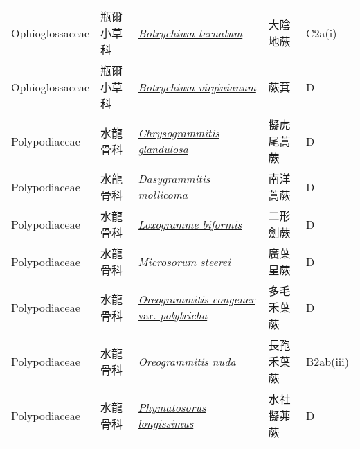 {\begin{longtable}{p{2.5cm}p{2.5cm}p{4.5cm}p{2.5cm}p{3cm}}
    Ophioglossaceae & 瓶爾小草科 & \href{http://www.theplantlist.org/tpl1.1/search?q=Botrychium+ternatum}{\textit{Botrychium ternatum} } & 大陰地蕨 & C2a(i) \index{Botrychium@\textit{Botrychium}!ternatum@\textit{ternatum}}  \index{大陰地蕨} \\
    Ophioglossaceae & 瓶爾小草科 & \href{http://www.theplantlist.org/tpl1.1/search?q=Botrychium+virginianum}{\textit{Botrychium virginianum} } & 蕨萁 & D \index{Botrychium@\textit{Botrychium}!virginianum@\textit{virginianum}}  \index{蕨萁} \\
    Polypodiaceae & 水龍骨科 & \href{http://www.theplantlist.org/tpl1.1/search?q=Chrysogrammitis+glandulosa}{\textit{Chrysogrammitis glandulosa} } & 擬虎尾蒿蕨 & D \index{Chrysogrammitis@\textit{Chrysogrammitis}!glandulosa@\textit{glandulosa}}  \index{擬虎尾蒿蕨} \\
    Polypodiaceae & 水龍骨科 & \href{http://www.theplantlist.org/tpl1.1/search?q=Dasygrammitis+mollicoma}{\textit{Dasygrammitis mollicoma} } & 南洋蒿蕨 & D \index{Dasygrammitis@\textit{Dasygrammitis}!mollicoma@\textit{mollicoma}}  \index{南洋蒿蕨} \\
    Polypodiaceae & 水龍骨科 & \href{http://www.theplantlist.org/tpl1.1/search?q=Loxogramme+biformis}{\textit{Loxogramme biformis} } & 二形劍蕨 & D \index{Loxogramme@\textit{Loxogramme}!biformis@\textit{biformis}}  \index{二形劍蕨} \\
    Polypodiaceae & 水龍骨科 & \href{http://www.theplantlist.org/tpl1.1/search?q=Microsorum+steerei}{\textit{Microsorum steerei} } & 廣葉星蕨 & D \index{Microsorum@\textit{Microsorum}!steerei@\textit{steerei}}  \index{廣葉星蕨} \\
    Polypodiaceae & 水龍骨科 & \href{http://www.theplantlist.org/tpl1.1/search?q=Oreogrammitis+congener+var.+polytricha}{\textit{Oreogrammitis congener} var. \textit{polytricha} } & 多毛禾葉蕨 & D \index{Oreogrammitis@\textit{Oreogrammitis}!congener@\textit{congener}!var. polytricha@var. \textit{polytricha}}  \index{多毛禾葉蕨} \\
    Polypodiaceae & 水龍骨科 & \href{http://www.theplantlist.org/tpl1.1/search?q=Oreogrammitis+nuda}{\textit{Oreogrammitis nuda} } & 長孢禾葉蕨 & B2ab(iii) \index{Oreogrammitis@\textit{Oreogrammitis}!nuda@\textit{nuda}}  \index{長孢禾葉蕨} \\
    Polypodiaceae & 水龍骨科 & \href{http://www.theplantlist.org/tpl1.1/search?q=Phymatosorus+longissimus}{\textit{Phymatosorus longissimus} } & 水社擬茀蕨 & D \index{Phymatosorus@\textit{Phymatosorus}!longissimus@\textit{longissimus}}  \index{水社擬茀蕨} \\

\end{longtable}}
